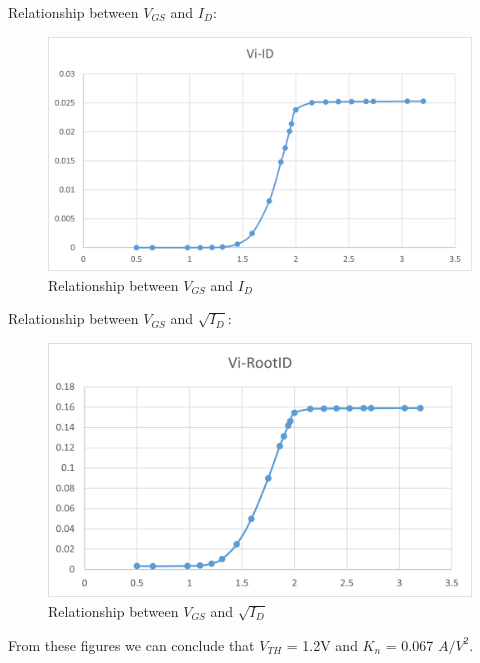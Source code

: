     \FloatBarrier
    Relationship between $V_{GS}$ and $I_D$:\\
    \begin{figure}[H]
        \centering
        \includegraphics[width=0.5\linewidth]{Experiment_08/Images/L8_DCF2.png}
        \caption{Relationship between $V_{GS}$ and $I_D$}
        \label{l8dctf2}
    \end{figure}
    \FloatBarrier
    Relationship between $V_{GS}$ and $\sqrt{I_D}$:\\
    \begin{figure}[H]
        \centering
        \includegraphics[width=0.65\linewidth]{Experiment_08/Images/L8_DCF3.png}
        \caption{Relationship between $V_{GS}$ and $\sqrt{I_D}$}
        \label{L8dctf3}
    \end{figure}
\FloatBarrier
    From these figures we can conclude that $V_{TH}$ = 1.2V and $K_n$ =  0.067 $A/V^2$.

